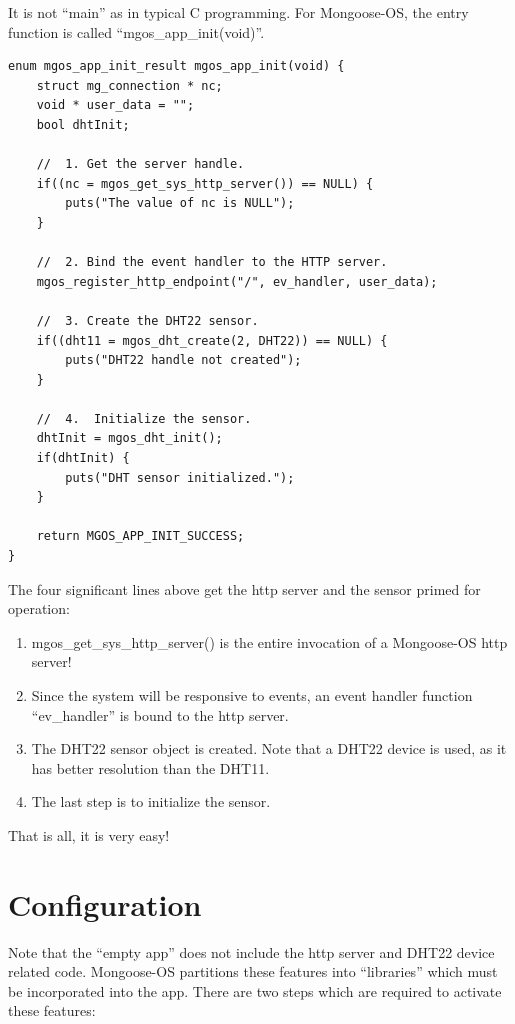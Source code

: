 \documentclass[oneside,letterpaper,12pt]{book}
\providecommand{\tightlist}{%
  \setlength{\itemsep}{0pt}\setlength{\parskip}{0pt}}
\begin{document}
It is not ``main'' as in typical C programming. For Mongoose-OS, the
entry function is called ``mgos\_app\_init(void)''.

\begin{verbatim}
enum mgos_app_init_result mgos_app_init(void) {
    struct mg_connection * nc;
    void * user_data = "";
    bool dhtInit;

    //  1. Get the server handle.
    if((nc = mgos_get_sys_http_server()) == NULL) {
        puts("The value of nc is NULL");
    }

    //  2. Bind the event handler to the HTTP server.
    mgos_register_http_endpoint("/", ev_handler, user_data);

    //  3. Create the DHT22 sensor.
    if((dht11 = mgos_dht_create(2, DHT22)) == NULL) {
        puts("DHT22 handle not created");
    }

    //  4.  Initialize the sensor.
    dhtInit = mgos_dht_init();
    if(dhtInit) {
        puts("DHT sensor initialized.");
    }

    return MGOS_APP_INIT_SUCCESS;
}
\end{verbatim}

The four significant lines above get the http server and the sensor
primed for operation:

\begin{enumerate}
\def\labelenumi{\arabic{enumi}.}
\tightlist
\item
  mgos\_get\_sys\_http\_server() is the entire invocation of a
  Mongoose-OS http server!
\item
  Since the system will be responsive to events, an event handler
  function ``ev\_handler'' is bound to the http server.
\item
  The DHT22 sensor object is created. Note that a DHT22 device is used,
  as it has better resolution than the DHT11.
\item
  The last step is to initialize the sensor.
\end{enumerate}

That is all, it is very easy!

\section{Configuration}\label{configuration}

Note that the ``empty app'' does not include the http server and DHT22
device related code. Mongoose-OS partitions these features into
``libraries'' which must be incorporated into the app. There are two
steps which are required to activate these features:
\end{document}
